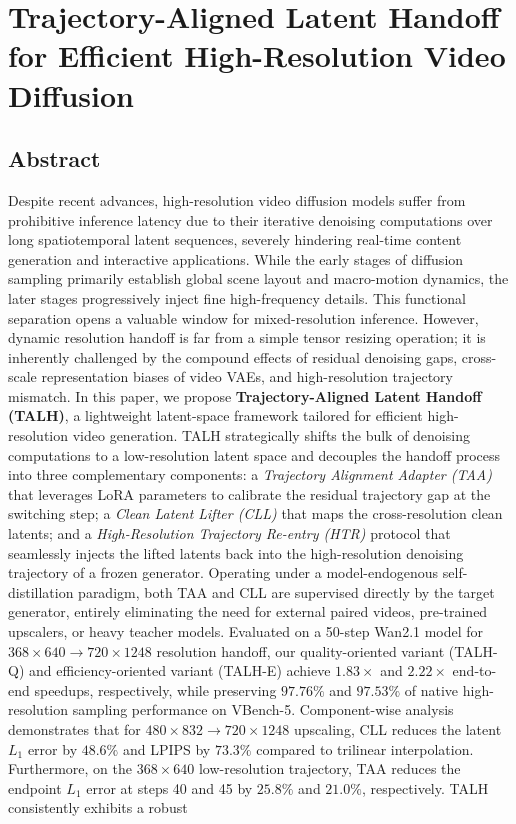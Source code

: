\hypertarget{trajectory-aligned-latent-handoff-for-efficient-high-resolution-video-diffusion}{%
\section{Trajectory-Aligned Latent Handoff for Efficient High-Resolution Video Diffusion}\label{trajectory-aligned-latent-handoff-for-efficient-high-resolution-video-diffusion}}

\hypertarget{abstract}{%
\subsection{Abstract}\label{abstract}}

Despite recent advances, high-resolution video diffusion models suffer from prohibitive inference latency due to their iterative denoising computations over long spatiotemporal latent sequences, severely hindering real-time content generation and interactive applications. While the early stages of diffusion sampling primarily establish global scene layout and macro-motion dynamics, the later stages progressively inject fine high-frequency details. This functional separation opens a valuable window for mixed-resolution inference. However, dynamic resolution handoff is far from a simple tensor resizing operation; it is inherently challenged by the compound effects of residual denoising gaps, cross-scale representation biases of video VAEs, and high-resolution trajectory mismatch. In this paper, we propose \textbf{Trajectory-Aligned Latent Handoff (TALH)}, a lightweight latent-space framework tailored for efficient high-resolution video generation. TALH strategically shifts the bulk of denoising computations to a low-resolution latent space and decouples the handoff process into three complementary components: a \emph{Trajectory Alignment Adapter (TAA)} that leverages LoRA parameters to calibrate the residual trajectory gap at the switching step; a \emph{Clean Latent Lifter (CLL)} that maps the cross-resolution clean latents; and a \emph{High-Resolution Trajectory Re-entry (HTR)} protocol that seamlessly injects the lifted latents back into the high-resolution denoising trajectory of a frozen generator. Operating under a model-endogenous self-distillation paradigm, both TAA and CLL are supervised directly by the target generator, entirely eliminating the need for external paired videos, pre-trained upscalers, or heavy teacher models. Evaluated on a 50-step Wan2.1 model for \(368\times640 \rightarrow 720\times1248\) resolution handoff, our quality-oriented variant (TALH-Q) and efficiency-oriented variant (TALH-E) achieve \(1.83\times\) and \(2.22\times\) end-to-end speedups, respectively, while preserving \(97.76\%\) and \(97.53\%\) of native high-resolution sampling performance on VBench-5. Component-wise analysis demonstrates that for \(480\times832 \rightarrow 720\times1248\) upscaling, CLL reduces the latent \(L_1\) error by \(48.6\%\) and LPIPS by \(73.3\%\) compared to trilinear interpolation. Furthermore, on the \(368\times640\) low-resolution trajectory, TAA reduces the endpoint \(L_1\) error at steps 40 and 45 by \(25.8\%\) and \(21.0\%\), respectively. TALH consistently exhibits a robust 